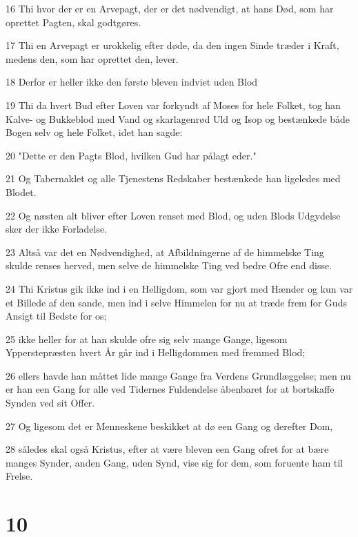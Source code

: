 \par 16 Thi hvor der er en Arvepagt, der er det nødvendigt, at hans Død, som har oprettet Pagten, skal godtgøres.
\par 17 Thi en Arvepagt er urokkelig efter døde, da den ingen Sinde træder i Kraft, medens den, som har oprettet den, lever.
\par 18 Derfor er heller ikke den første bleven indviet uden Blod
\par 19 Thi da hvert Bud efter Loven var forkyndt af Moses for hele Folket, tog han Kalve- og Bukkeblod med Vand og skarlagenrød Uld og Isop og bestænkede både Bogen selv og hele Folket, idet han sagde:
\par 20 "Dette er den Pagts Blod, hvilken Gud har pålagt eder."
\par 21 Og Tabernaklet og alle Tjenestens Redskaber bestænkede han ligeledes med Blodet.
\par 22 Og næsten alt bliver efter Loven renset med Blod, og uden Blods Udgydelse sker der ikke Forladelse.
\par 23 Altså var det en Nødvendighed, at Afbildningerne af de himmelske Ting skulde renses herved, men selve de himmelske Ting ved bedre Ofre end disse.
\par 24 Thi Kristus gik ikke ind i en Helligdom, som var gjort med Hænder og kun var et Billede af den sande, men ind i selve Himmelen for nu at træde frem for Guds Ansigt til Bedste for os;
\par 25 ikke heller for at han skulde ofre sig selv mange Gange, ligesom Ypperstepræsten hvert År går ind i Helligdommen med fremmed Blod;
\par 26 ellers havde han måttet lide mange Gange fra Verdens Grundlæggelse; men nu er han een Gang for alle ved Tidernes Fuldendelse åbenbaret for at bortskaffe Synden ved sit Offer.
\par 27 Og ligesom det er Menneskene beskikket at dø een Gang og derefter Dom,
\par 28 således skal også Kristus, efter at være bleven een Gang ofret for at bære manges Synder, anden Gang, uden Synd, vise sig for dem, som foruente ham til Frelse.

\chapter{10}

